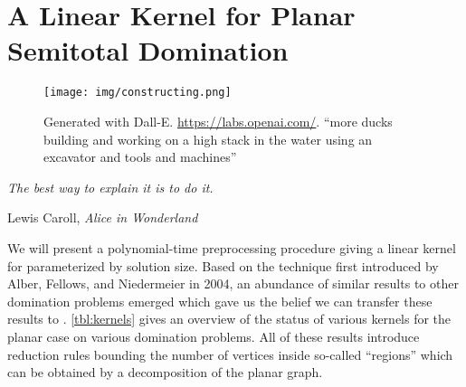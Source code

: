 \chapter{A Linear Kernel for Planar Semitotal Domination}\label{ch:linkern}

\vspace*{-50pt}
\begin{figure}[ht]
\texttt{[image: img/constructing.png]}
        \captionsetup{textformat=empty,labelformat=blank}
        \caption[Generated with Dalle-E. Knowledge Cutoff 09-2022]{Generated with Dall-E. \url{https://labs.openai.com/}. ``more ducks building and working on  a high stack in the water using an excavator and tools and machines''}
\end{figure}

\epigraph{\itshape The best way to explain it is to do it.}{Lewis Caroll, \textit{Alice in Wonderland}}

We will present a polynomial-time preprocessing procedure giving a linear kernel for \psdom parameterized by solution size. Based on the technique first introduced by Alber, Fellows, and Niedermeier \cite{Alber2004} in 2004, an abundance of similar results to other domination problems emerged which gave us the belief we can transfer these results to \sdom. 
\cref{tbl:kernels} gives an overview of the status of various kernels for the planar case on various domination problems.
All of these results introduce reduction rules bounding the number of vertices inside so-called ``regions'' which can be obtained by a decomposition of the planar graph. 

